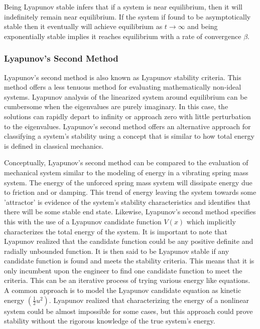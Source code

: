 Being Lyapunov stable infers that if a system is near equilibrium, then it will indefinitely remain near equilibrium.  If the system if found to be asymptotically stable then it eventually will achieve equilibrium as $t\to \infty$ and being exponentially stable implies it reaches equilibrium with a rate of convergence $\beta$.

\subsubsection{Lyapunov's Second Method}
 
Lyapunov's second method is also known as Lyapunov stability criteria.  This method offers a less tenuous method for evaluating mathematically non-ideal systems.  Lyapunov analysis of the linearized system around equilibrium can be cumbersome when the eigenvalues are purely imaginary.  In this case, the solutions can rapidly depart to infinity or approach zero with little perturbation to the eigenvalues.  Lyapunov's second method offers an alternative approach for classifying a system's stability using a concept that is similar to how total energy is defined in classical mechanics.

Conceptually, Lyapunov's second method can be compared to the evaluation of mechanical system similar to the modeling of energy in a vibrating spring mass system.  The energy of the unforced spring mass system will dissipate energy due to friction and or damping.  This trend of energy leaving the system towards some 'attractor' is evidence of the system's stability characteristics and identifies that there will be some stable end state.  Likewise, Lyapunov's second method specifies this with the use of a Lyapunov candidate function $V(x)$ which implicitly characterizes the total energy of the system.  It is important to note that Lyapunov realized that the candidate function could be any positive definite and radially unbounded function.  It is then said to be Lyapunov stable if any candidate function is found and meets the stability criteria.  This means that it is only incumbent upon the engineer to find one candidate function to meet the criteria.  This can be an iterative process of trying various energy like equations.  A common approach is to model the Lyapunov candidate equation as kinetic energy $(\frac{1}{2}u^2)$.  Lyapunov realized that characterizing the energy of a nonlinear system could be almost impossible for some cases, but this approach could prove stability without the rigorous knowledge of the true system's energy.

